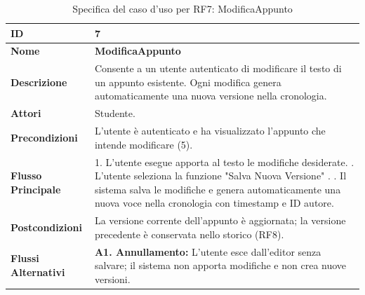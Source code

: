 \begin{table}[H]
    \small
    \caption{Specifica del caso d'uso per RF7: ModificaAppunto}
    \label{tab:spec_uc7}
    \begin{tabularx}{\textwidth}{@{}l X@{}}
        \toprule
        \textbf{ID} & 7 \\
        \midrule
        \textbf{Nome} & \textbf{ModificaAppunto} \\
        \midrule
        \textbf{Descrizione} & Consente a un utente autenticato di modificare il testo di un appunto esistente. Ogni modifica genera automaticamente una nuova versione nella cronologia. \\
        \midrule
        \textbf{Attori} & Studente. \\
        \midrule
        \textbf{Precondizioni} & L'utente è autenticato e ha visualizzato l'appunto che intende modificare (5). \\
        \midrule
        \textbf{Flusso Principale} & 
        1. L'utente esegue apporta al testo le modifiche desiderate. \newline
        2. L'utente seleziona la funzione "Salva Nuova Versione" . \newline
        3. Il sistema salva le modifiche e genera automaticamente una nuova voce nella cronologia con timestamp e ID autore. \\
        \midrule
        \textbf{Postcondizioni} & La versione corrente dell'appunto è aggiornata; la versione precedente è conservata nello storico (RF8). \\
        \midrule
        \textbf{Flussi Alternativi} & \textbf{A1. Annullamento:} L'utente esce dall'editor senza salvare; il sistema non apporta modifiche e non crea nuove versioni. \\
        \bottomrule
    \end{tabularx}
\end{table}

